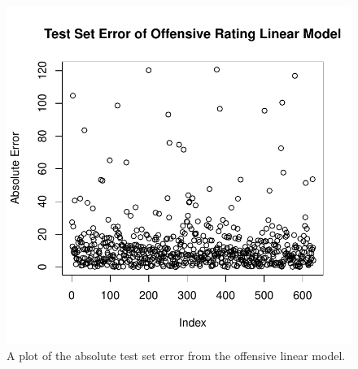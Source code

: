 \documentclass[12pt]{article}
\begin{document}
\begin{figure}[tbp]
	\centering
	\includegraphics[width=\textwidth]{olm.test.error}
	\caption{A plot of the absolute test set error from the offensive linear model.}
	\label{fig:olm.test.error}
\end{figure}

\begin{table}[t]
\centering
{}
\caption{Offensive Linear Model Evaluators}
\label{tab:olm-results}
\end{table}
\end{document}
